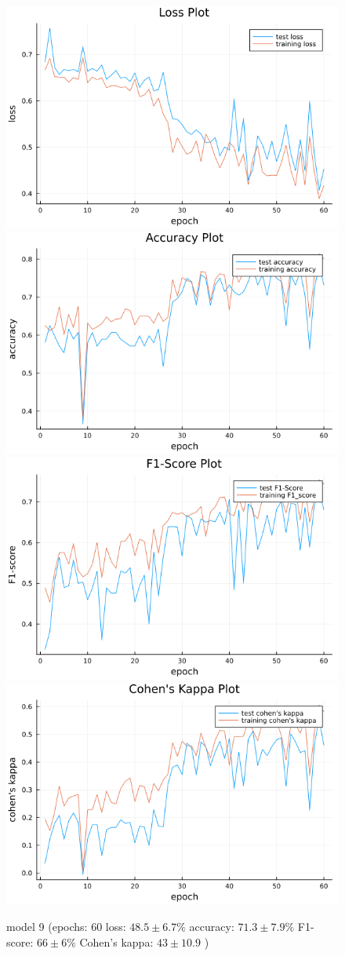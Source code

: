 \documentclass[
a4paper, 
12pt,
grayscalebody, %
abstract=on,
twoside, BCOR10mm, 12pt, DIV13,headinclude, footexclude, final, abstracton, openright
]{ibireprt}
\numberwithin{equation}{chapter}
\numberwithin{table}{chapter}
\numberwithin{figure}{chapter}
\numberwithin{algorithm}{chapter}
\numberwithin{example}{chapter}
\numberwithin{example}{chapter}
\begin{document}
\begin{figure}[h]
	\includegraphics[width=0.4\linewidth]{loss_png_final_3_1.png}\hfill
	\includegraphics[width=0.4\linewidth]{accuracy_png_final_3_1.png}
	\\[\smallskipamount]
	\includegraphics[width=0.4\linewidth]{f1_score_png_final_3_1.png}\hfill
	\includegraphics[width=0.4\linewidth]{cohens_kappa_png_final_3_1.png}
	\caption{model 9 (epochs: 60 loss: $48.5\pm6.7\% $ accuracy: $71.3\pm7.9\%$ F1-score: $66\pm6\%$  Cohen's kappa: $43\pm10.9$ )}
\end{figure}
\end{document}
